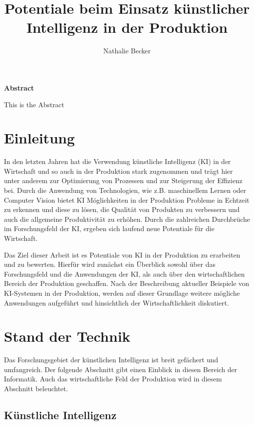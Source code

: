 \documentclass[a4paper,12pt, german]{report}
\begin{document}
\title{Potentiale beim Einsatz künstlicher Intelligenz in der Produktion}
\author{Nathalie Becker}


\begin{titlepage}
\maketitle
\end{titlepage}


\begin{center}
\textbf{Abstract}
\end{center}
This is the Abstract


\tableofcontents

\chapter{Einleitung}
In den letzten Jahren hat die Verwendung künstliche Intelligenz (KI) in der Wirtschaft und so auch in der Produktion stark zugenommen und trägt hier unter anderem zur Optimierung von Prozessen und zur Steigerung der Effizienz bei. Durch die Anwendung von Technologien, wie z.B. maschinellem Lernen oder Computer Vision bietet KI Möglichkeiten in der Produktion Probleme in Echtzeit zu erkennen und diese zu lösen, die Qualität von Produkten zu verbessern und auch die allgemeine Produktivität zu erhöhen. Durch die zahlreichen Durchbrüche im Forschungsfeld der KI, ergeben sich laufend neue Potentiale für die Wirtschaft. 

Das Ziel dieser Arbeit ist es Potentiale von KI in der Produktion zu erarbeiten und zu bewerten. Hierfür wird zunächst ein Überblick sowohl über das Forschungsfeld und die Anwendungen der KI, als auch über den wirtschaftlichen Bereich der Produktion geschaffen. Nach der Beschreibung aktueller Beispiele von KI-Systemen in der Produktion, werden auf dieser Grundlage weitere mögliche Anwendungen aufgeführt und hinsichtlich der Wirtschaftlichkeit diskutiert.  

\chapter{Stand der Technik}

Das Forschungsgebiet der künstlichen Intelligenz ist breit gefächert und umfangreich. Der folgende Abschnitt gibt einen Einblick in diesen Bereich der Informatik. Auch das wirtschaftliche Feld der Produktion wird in diesem Abschnitt beleuchtet.

\section{Künstliche Intelligenz}
\end{document}
